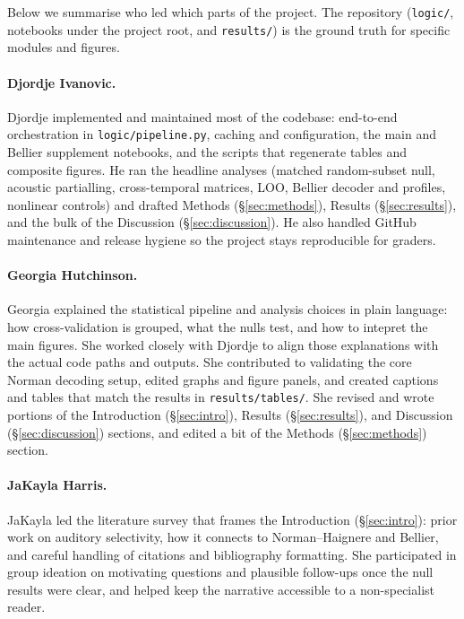 \documentclass[11pt]{article}
\begin{document}
\sloppy
Below we summarise who led which parts of the project. The repository (\texttt{logic/}, notebooks under the project root, and \texttt{results/}) is the ground truth for specific modules and figures.

\paragraph{Djordje Ivanovic.}
Djordje implemented and maintained most of the codebase: end-to-end orchestration in \texttt{logic/pipeline.py}, caching and configuration, the main and Bellier supplement notebooks, and the scripts that regenerate tables and composite figures. He ran the headline analyses (matched random-subset null, acoustic partialling, cross-temporal matrices, LOO, Bellier decoder and profiles, nonlinear controls) and drafted Methods (\S\ref{sec:methods}), Results (\S\ref{sec:results}), and the bulk of the Discussion (\S\ref{sec:discussion}). He also handled GitHub maintenance and release hygiene so the project stays reproducible for graders.

\paragraph{Georgia Hutchinson.}
Georgia explained the statistical pipeline and analysis choices in plain language: how cross-validation is grouped, what the nulls test, and how to intepret the main figures. She worked closely with Djordje to align those explanations with the actual code paths and outputs. She contributed to validating the core Norman decoding setup, edited graphs and figure panels, and created captions and tables that match the results in \texttt{results/tables/}. She revised and wrote portions of the Introduction (\S\ref{sec:intro}), Results (\S\ref{sec:results}), and Discussion (\S\ref{sec:discussion}) sections, and edited a bit of the Methods (\S\ref{sec:methods}) section. 

\paragraph{JaKayla Harris.}
JaKayla led the literature survey that frames the Introduction (\S\ref{sec:intro}): prior work on auditory selectivity, how it connects to Norman--Haignere and Bellier, and careful handling of citations and bibliography formatting. She participated in group ideation on motivating questions and plausible follow-ups once the null results were clear, and helped keep the narrative accessible to a non-specialist reader.
\end{document}
